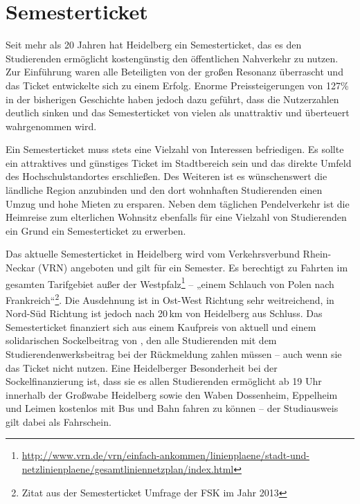 %

\section{Semesterticket}
Seit mehr als 20 Jahren hat Heidelberg ein Semesterticket, das es den Studierenden ermöglicht kostengünstig den öffentlichen Nahverkehr zu nutzen. Zur Einführung waren alle Beteiligten von der großen Resonanz überrascht und das Ticket entwickelte sich zu einem Erfolg. Enorme Preissteigerungen von 127\% in der bisherigen Geschichte haben jedoch dazu geführt, dass die Nutzerzahlen deutlich sinken und das Semesterticket von vielen als unattraktiv und überteuert wahrgenommen wird.

Ein Semesterticket muss stets eine Vielzahl von Interessen befriedigen. Es sollte ein attraktives und günstiges Ticket im Stadtbereich sein und das direkte Umfeld des Hochschulstandortes erschließen. Des Weiteren ist es wünschenswert die ländliche Region anzubinden und den dort wohnhaften Studierenden einen Umzug und hohe Mieten zu ersparen. Neben dem täglichen Pendelverkehr ist die Heimreise zum elterlichen Wohnsitz ebenfalls für eine Vielzahl von Studierenden ein Grund ein Semesterticket zu erwerben.

Das aktuelle Semesterticket in Heidelberg wird vom Verkehrsverbund Rhein-Neckar (VRN) angeboten und gilt für ein Semester. Es berechtigt zu Fahrten im gesamten Tarifgebiet außer der Westpfalz\footnote{\url{http://www.vrn.de/vrn/einfach-ankommen/linienplaene/stadt-und-netzlinienplaene/gesamtliniennetzplan/index.html}} -- „einem Schlauch von Polen nach Frankreich“\footnote{Zitat aus der Semesterticket Umfrage der FSK im Jahr 2013}. Die Ausdehnung ist in Ost-West Richtung sehr weitreichend, in Nord-Süd Richtung ist jedoch nach 20\,km von Heidelberg aus Schluss. Das Semesterticket finanziert sich aus einem Kaufpreis von aktuell \EUR{\semesterticket} und einem solidarischen Sockelbeitrag von \EUR{\sockelbeitrag}, den alle Studierenden mit dem Studierendenwerksbeitrag bei der Rückmeldung zahlen müssen -- auch wenn sie das Ticket nicht nutzen. Eine Heidelberger Besonderheit bei der Sockelfinanzierung ist, dass sie es allen Studierenden ermöglicht ab 19 Uhr innerhalb der Großwabe Heidelberg sowie den Waben Dossenheim, Eppelheim und Leimen kostenlos mit Bus und Bahn fahren zu können -- der Studiausweis gilt dabei als Fahrschein.

